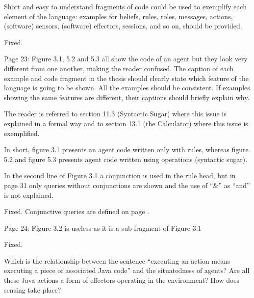 \documentclass{article}
\newcommand{\todo}[1]{[\textcolor{red}{TODO}: #1]}
\newenvironment{them}{\noindent\begingroup\color{blue}}{\endgroup\par}
\begin{document}
\begin{them}

Short and easy to understand fragments of code could be used to exemplify each
element of the language: examples for beliefs, rules, roles, messages, actions,
(software) sensors, (software) effectors, sessions, and so on, should be
provided.

\end{them}
Fixed. 

\begin{them}

Page 23:
Figure 3.1, 5.2 and 5.3 all show the code of an agent but they look very
different from one another, making the reader confused. The caption of each
example and code fragment in the thesis should clearly state which feature of
the language is going to be shown. All the examples should be consistent. If
examples showing the same features are different, their captions should briefly
explain why.

\end{them}
The reader is referred to section 11.3 (Syntactic Sugar) where this issue is
explained in a formal way and to section 13.1 (the Calculator) where this issue
is exemplified.

In short, figure 3.1 presents an agent code written only with rules, whereas
figure 5.2 and figure 5.3 presents agent code written using operations
(syntactic sugar).

\begin{them}

In the second line of Figure 3.1 a conjunction is used in the rule head, but in
page 31 only queries without conjunctions are shown and the use of “\&” as
“and” is not explained.

\end{them}
Fixed. Conjunctive queries are defined on page . 

\begin{them}

Page 24:
Figure 3.2 is useless as it is a sub-fragment of Figure 3.1
\end{them}
Fixed. 

\begin{them}

Which is the relationship between the sentence “executing an action means
executing a piece of associated Java code” and the situatedness of agents? Are
all these Java actions a form of effectors operating in the environment? How
does sensing take place?

\end{them}
\todo{explain this} 
\end{document}
